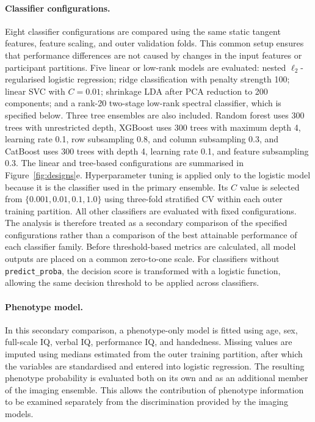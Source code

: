 \paragraph{\textbf{Classifier configurations.}}
\label{par:classifier-family}
Eight classifier configurations are compared using the same static tangent features, feature scaling, and outer validation folds. This common setup ensures that performance differences are not caused by changes in the input features or participant partitions. Five linear or low-rank models are evaluated: nested $\ell_2$-regularised logistic regression; ridge classification with penalty strength 100; linear SVC with $C=0.01$; shrinkage LDA after PCA reduction to 200 components; and a rank-20 two-stage low-rank spectral classifier, which is specified below. Three tree ensembles are also included. Random forest uses 300 trees with unrestricted depth, XGBoost uses 300 trees with maximum depth 4, learning rate 0.1, row subsampling 0.8, and column subsampling 0.3, and CatBoost \citep{Prokhorenkovaetal2018} uses 300 trees with depth 4, learning rate 0.1, and feature subsampling 0.3. The linear and tree-based configurations are summarised in Figure~\ref{fig:designs}e. Hyperparameter tuning is applied only to the logistic model because it is the classifier used in the primary ensemble. Its $C$ value is selected from $\{0.001,0.01,0.1,1.0\}$ using three-fold stratified CV within each outer training partition. All other classifiers are evaluated with fixed configurations. The analysis is therefore treated as a secondary comparison of the specified configurations rather than a comparison of the best attainable performance of each classifier family. Before threshold-based metrics are calculated, all model outputs are placed on a common zero-to-one scale. For classifiers without \texttt{predict\_proba}, the decision score is transformed with a logistic function, allowing the same decision threshold to be applied across classifiers.

\paragraph{\textbf{Phenotype model.}}
\label{par:phenotype-model}
In this secondary comparison, a phenotype-only model is fitted using age, sex, full-scale IQ, verbal IQ, performance IQ, and handedness. Missing values are imputed using medians estimated from the outer training partition, after which the variables are standardised and entered into logistic regression. The resulting phenotype probability is evaluated both on its own and as an additional member of the imaging ensemble. This allows the contribution of phenotype information to be examined separately from the discrimination provided by the imaging models.

